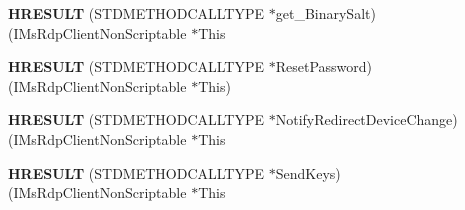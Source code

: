 \begin{DoxyCompactItemize}
\item 
\mbox{\label{struct_i_ms_rdp_client_non_scriptable_vtbl_a8df72b1d09a711de676f19f286daebb1}} 
{\bfseries H\+R\+E\+S\+U\+LT} (S\+T\+D\+M\+E\+T\+H\+O\+D\+C\+A\+L\+L\+T\+Y\+PE $\ast$get\+\_\+\+Binary\+Salt)(I\+Ms\+Rdp\+Client\+Non\+Scriptable $\ast$This
\item 
\mbox{\label{struct_i_ms_rdp_client_non_scriptable_vtbl_a97a8f2eea25bd62c20dbcb57674b9199}} 
{\bfseries H\+R\+E\+S\+U\+LT} (S\+T\+D\+M\+E\+T\+H\+O\+D\+C\+A\+L\+L\+T\+Y\+PE $\ast$Reset\+Password)(I\+Ms\+Rdp\+Client\+Non\+Scriptable $\ast$This)
\item 
\mbox{\label{struct_i_ms_rdp_client_non_scriptable_vtbl_a34cfa8fe9b70d25ff2ff4bc141b8196d}} 
{\bfseries H\+R\+E\+S\+U\+LT} (S\+T\+D\+M\+E\+T\+H\+O\+D\+C\+A\+L\+L\+T\+Y\+PE $\ast$Notify\+Redirect\+Device\+Change)(I\+Ms\+Rdp\+Client\+Non\+Scriptable $\ast$This
\item 
\mbox{\label{struct_i_ms_rdp_client_non_scriptable_vtbl_a0c99c48cec27d6c1b0b8924c208a7164}} 
{\bfseries H\+R\+E\+S\+U\+LT} (S\+T\+D\+M\+E\+T\+H\+O\+D\+C\+A\+L\+L\+T\+Y\+PE $\ast$Send\+Keys)(I\+Ms\+Rdp\+Client\+Non\+Scriptable $\ast$This
\end{DoxyCompactItemize}
